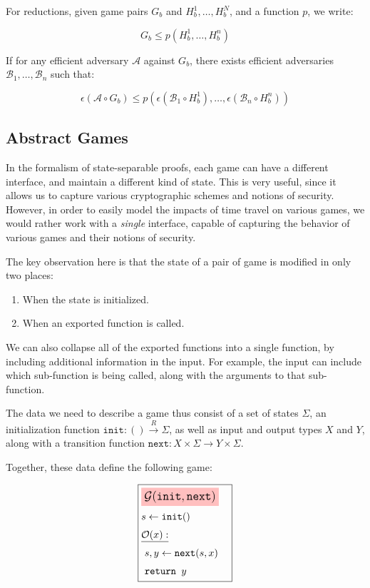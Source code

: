 For reductions, given game pairs $G_b$ and $H_b^1, \ldots, H_b^N$,
and a function $p$, we write:

$$
G_b \leq p(H_b^1, \ldots, H_b^n)
$$

If for any efficient adversary $\mathcal{A}$ against $G_b$, there exists efficient
adversaries $\mathcal{B}_1, \ldots, \mathcal{B}_n$ such that:

$$
\epsilon(\mathcal{A} \circ G_b) \leq p(\epsilon(\mathcal{B}_1 \circ H_b^1), \ldots, \epsilon(\mathcal{B}_n \circ H_b^n))
$$

\subsection{Abstract Games}

In the formalism of state-separable proofs, each game can have a different interface,
and maintain a different kind of state.
This is very useful, since it allows us to capture various cryptographic schemes
and notions of security.
However, in order to easily model the impacts of time travel on various games,
we would rather work with a \emph{single} interface, capable of capturing the behavior
of various games and their notions of security.

The key observation here is that the state of a pair of game is modified in only two places:

\begin{enumerate}
    \item When the state is initialized.
    \item When an exported function is called.
\end{enumerate}

We can also collapse all of the exported functions into a single function,
by including additional information in the input.
For example, the input can include which sub-function is being called,
along with the arguments to that sub-function.

The data we need to describe a game thus consist of a set of states
$\Sigma$, an initialization function $\texttt{init} : () \xrightarrow{R} \Sigma$,
as well as input and output types $X$ and $Y$, along with
a transition function ${\texttt{next} : X \times \Sigma \to Y \times \Sigma}$.

Together, these data define the following game:

\begin{game}
\captionsetup{justification=centering}
$$
\boxed{
\begin{aligned}
&\colorbox{pink}{\large $\mathcal{G}(\texttt{init}, \texttt{next})$}\cr
&s \gets \texttt{init}()\cr
&\underline{\mathcal{O}(x):}\cr
&\ s, y \gets \texttt{next}(s, x)\cr
&\ \texttt{return } y
\end{aligned}
}
$$
\caption{$\mathcal{G}(\texttt{init}, \texttt{next})$}
\end{game}

